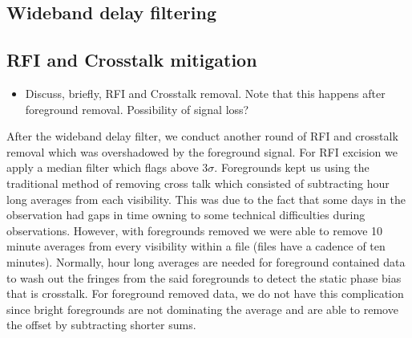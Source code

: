 \documentclass[twocolumn,numberedappendix]{emulateapj}
\begin{document}
%
%



\subsection{Wideband delay filtering}

\subsection{RFI and Crosstalk mitigation}
\begin{itemize}
    \item{Discuss, briefly, RFI and Crosstalk removal. Note that this happens
after foreground removal. Possibility of signal loss?}
\end{itemize}
After the wideband delay filter, we conduct another round of RFI and crosstalk
removal which was overshadowed by the foreground signal. For RFI excision we
apply a median filter which flags above $3\sigma$. Foregrounds kept us using the
traditional method of removing cross talk which consisted of subtracting hour
long averages from each visibility. This was due to the fact that some days in
the observation had gaps in time owning to some technical difficulties during
observations. However, with foregrounds removed we were able to remove 10 minute
averages from every visibility within a file (files have a cadence of ten
minutes). Normally, hour long averages are needed for foreground contained data
to wash out the fringes from the said foregrounds to detect the static phase
bias that is crosstalk. For foreground removed data, we do not have this
complication since bright foregrounds are not dominating the average and are
able to remove the offset by subtracting shorter sums.
\end{document}
